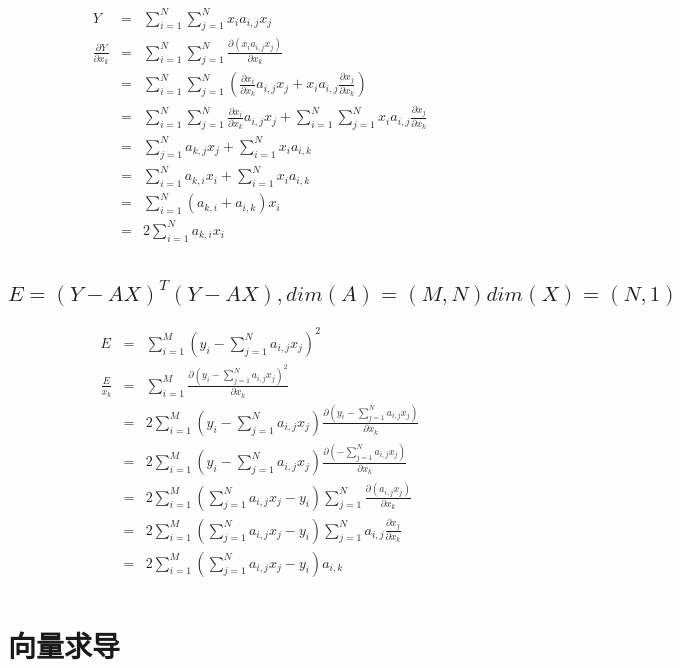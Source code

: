 \documentclass{article}
\begin{document}

\begin{eqnarray*}
Y &= &\sum_{i=1}^{N}\sum_{j=1}^{N}x_i a_{i,j} x_j \\
\frac{\partial Y}{\partial x_k} &=& \sum_{i=1}^{N}\sum_{j=1}^{N}\frac{\partial (x_i a_{i,j} x_j)}{\partial x_k} \\
&=& \sum_{i=1}^{N}\sum_{j=1}^{N}(\frac{\partial x_i}{\partial x_k}a_{i,j} x_j+
x_i a_{i,j} \frac{\partial x_j}{\partial x_k} )\\
&=& \sum_{i=1}^{N}\sum_{j=1}^{N}\frac{\partial x_i}{\partial x_k}a_{i,j} x_j+ 
\sum_{i=1}^{N}\sum_{j=1}^{N} x_i a_{i,j}\frac{\partial x_j}{\partial x_k}\\
&=& \sum_{j=1}^{N}a_{k,j} x_j+\sum_{i=1}^{N} x_i a_{i,k}\\
&=& \sum_{i=1}^{N}a_{k,i} x_i+\sum_{i=1}^{N} x_i a_{i,k}\\
&=& \sum_{i=1}^{N}(a_{k,i} +a_{i,k})x_i\\
&=& 2\sum_{i=1}^{N}a_{k,i}x_i\\
\end{eqnarray*}


\subsection{$E=(Y-AX)^T (Y-AX) , dim(A)=(M,N)dim(X)=(N,1)$}
\begin{eqnarray*}
E &=& \sum_{i=1}^{M}(y_i-\sum_{j=1}^{N}a_{i,j}x_j)^2 \\
\frac{E}{x_k}&=&\sum_{i=1}^{M}\frac{\partial (y_i-\sum_{j=1}^{N}a_{i,j}x_j)^2}{\partial x_k} \\
&=&2\sum_{i=1}^{M}(y_i-\sum_{j=1}^{N}a_{i,j}x_j)\frac{\partial (y_i-\sum_{j=1}^{N}a_{i,j}x_j)}{\partial x_k} \\
&=&2\sum_{i=1}^{M}(y_i-\sum_{j=1}^{N}a_{i,j}x_j)\frac{\partial (-\sum_{j=1}^{N}a_{i,j}x_j)}{\partial x_k} \\
&=&2\sum_{i=1}^{M}(\sum_{j=1}^{N}a_{i,j}x_j-y_i)\sum_{j=1}^{N}\frac{\partial (a_{i,j}x_j)}{\partial x_k} \\
&=&2\sum_{i=1}^{M}(\sum_{j=1}^{N}a_{i,j}x_j-y_i)\sum_{j=1}^{N}a_{i,j}\frac{\partial x_j}{\partial x_k} \\
&=&2\sum_{i=1}^{M}(\sum_{j=1}^{N}a_{i,j}x_j-y_i)a_{i,k} \\
\end{eqnarray*}

\section{向量求导}
\end{document}
